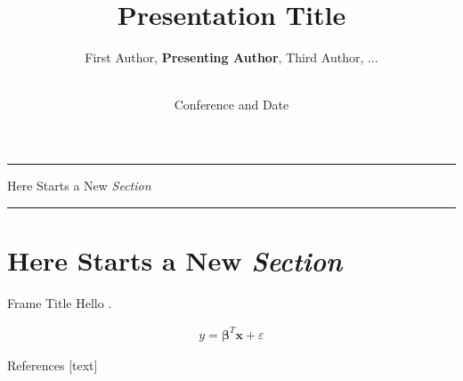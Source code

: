 \documentclass[10pt]{beamer} %
\author{
    First Author,
    \textbf{Presenting Author},
    Third Author, ...}
\title{
    Presentation Title}
\institute{Technical University of Denmark}
\date{\\[\bigskipamount]Conference and Date}
\newcommand{\transframe}[1]{
    \begin{frame}[c]{}
        \begin{center}
        \hrule \vskip 15pt
        \huge #1
        \vskip 15pt \hrule
        \end{center}
    \end{frame}
}
\newcommand{\secframe}[1]{
    \transframe{#1}
    \section{#1}
}
\renewcommand{\vec}[1]{\bm{#1}}
\begin{document}
\begin{frame}[t,plain]
\titlepage
\end{frame}

\secframe{Here Starts a New \emph{Section}}

\begin{frame}[t]{Frame Title}
Hello \cite{dummycite}.

\begin{align}
		y = \vec{\beta}^T \vec{x} + \varepsilon
\end{align}
\end{frame}

\begin{frame}[t]{References}  %
    [text]
    \renewcommand*{\bibfont}{\small}
    \printbibliography
\end{frame}
\end{document}
